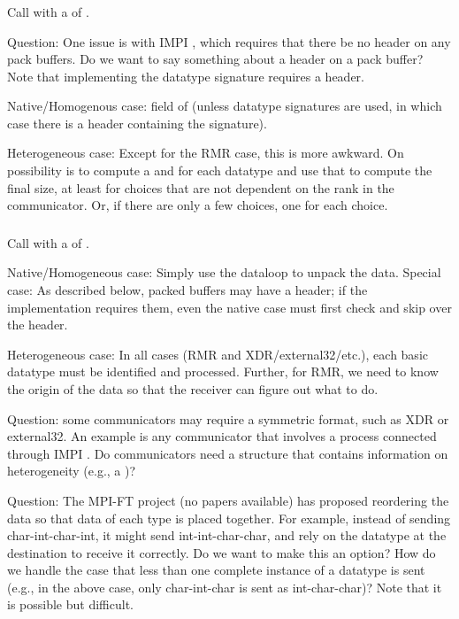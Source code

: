 \documentclass{article}
\begin{document}
\subsubsection{}
Call  with a  of .

Question: One issue is with IMPI \cite{impi}, which requires that there be no
header on any pack buffers.  Do we want to say something about a header on a
pack buffer?  Note that implementing the datatype signature
\cite{gro:mpi-datatypes:pvmmpi00} requires a header. 

\begin{adi3}
Native/Homogenous case:  field of
 (unless datatype signatures are used, in which
case there is a header containing the signature). 

Heterogeneous case: Except for the RMR case, this is more awkward.  On
possibility is to compute a 
 and  for
each datatype and use that to compute the final size, at least for choices
that are not dependent on the rank in the communicator.  Or, if there
are only a few choices, one for each choice.
\end{adi3}

\subsubsection{}
\label{sec:mpi-unpack}
Call  with a  of .

\begin{adi3}
Native/Homogeneous case: Simply use the dataloop to unpack the data.
Special case: As described below, packed buffers may have a header; if the
implementation requires them, even the native case must first check and skip
over the header.

Heterogeneous case:  In all cases (RMR and XDR/external32/etc.), each basic
datatype must be identified and processed.  Further, for RMR, we need to know
the origin of the data so that the receiver can figure out what to do.

Question: some communicators may require a symmetric format, such as XDR or
external32.  An example is any communicator that involves a process connected
through IMPI \cite{impi}.  Do communicators need a structure that contains
information on heterogeneity (e.g., a )?

Question:  The MPI-FT project (no papers available) has proposed reordering
the data so that data of each type is placed together.  For example, instead
of sending char-int-char-int, it might send int-int-char-char, and rely on the
datatype at the destination to receive it correctly.  Do we want to make this
an option?  How do we handle the case that less than one complete instance of
a datatype is sent (e.g., in the above case, only char-int-char is sent as
int-char-char)?  Note that it is possible but difficult.
\end{adi3}
\end{document}
